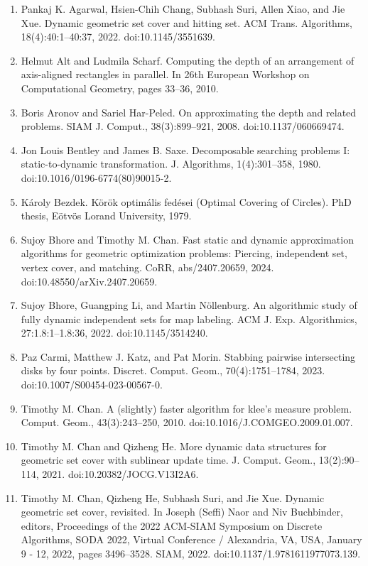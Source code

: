 \begin{enumerate}
\item[]  [1]  Pankaj K. Agarwal, Hsien-Chih Chang, Subhash Suri, Allen Xiao, and Jie Xue.  Dynamic geometric set cover and hitting set.  ACM Trans. Algorithms, 18(4):40:1–40:37, 2022.  doi:10.1145/3551639.  
\item[]  [2]  Helmut Alt and Ludmila Scharf.  Computing the depth of an arrangement of axis-aligned rectangles in parallel.  In 26th European Workshop on Computational Geometry, pages 33–36, 2010.  
\item[]  [3]  Boris Aronov and Sariel Har-Peled.  On approximating the depth and related problems.  SIAM J. Comput., 38(3):899–921, 2008.  doi:10.1137/060669474.  
\item[]  [4]  Jon Louis Bentley and James B. Saxe.  Decomposable searching problems I: static-to-dynamic transformation.  J. Algorithms, 1(4):301–358, 1980.  doi:10.1016/0196-6774(80)90015-2.  
\item[]  [5]  Károly Bezdek.  Körök optimális fedései (Optimal Covering of Circles).  PhD thesis, Eötvös Lorand University, 1979.  
\item[]  [6]  Sujoy Bhore and Timothy M. Chan.  Fast static and dynamic approximation algorithms for geometric optimization problems: Piercing, independent set, vertex cover, and matching.  CoRR, abs/2407.20659, 2024.  doi:10.48550/arXiv.2407.20659.  
\item[]  [7]  Sujoy Bhore, Guangping Li, and Martin Nöllenburg.  An algorithmic study of fully dynamic independent sets for map labeling.  ACM J. Exp. Algorithmics, 27:1.8:1–1.8:36, 2022.  doi:10.1145/3514240.  
\item[]  [8]  Paz Carmi, Matthew J. Katz, and Pat Morin.  Stabbing pairwise intersecting disks by four points.  Discret. Comput. Geom., 70(4):1751–1784, 2023.  doi:10.1007/S00454-023-00567-0.  
\item[]  [9]  Timothy M. Chan.  A (slightly) faster algorithm for klee’s measure problem.  Comput. Geom., 43(3):243–250, 2010.  doi:10.1016/J.COMGEO.2009.01.007.  
\item[]  [10]  Timothy M. Chan and Qizheng He.  More dynamic data structures for geometric set cover with sublinear update time.  J. Comput. Geom., 13(2):90–114, 2021.  doi:10.20382/JOCG.V13I2A6.  
\item[]  [11]  Timothy M. Chan, Qizheng He, Subhash Suri, and Jie Xue.  Dynamic geometric set cover, revisited.  In Joseph (Seffi) Naor and Niv Buchbinder, editors, Proceedings of the 2022 ACM-SIAM Symposium on Discrete Algorithms, SODA 2022, Virtual Conference / Alexandria, VA, USA, January 9 - 12, 2022, pages 3496–3528. SIAM, 2022.  doi:10.1137/1.9781611977073.139.  

\end{enumerate}
